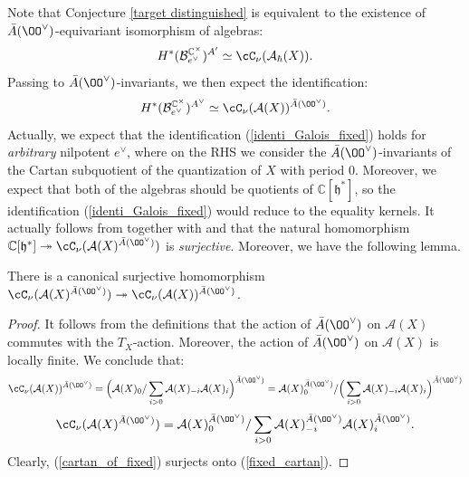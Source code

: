 \documentclass[12pt]{amsart}
\begin{document}
Note that Conjecture \ref{target distinguished} is equivalent to the existence of $\Bar{A}(\OO^\vee)$-equivariant isomorphism of algebras: 
\begin{equation}\label{identi_conj_dist_hbar_1}
    H^*(\mathcal{B}_{e^\vee}^{\mathbb{C}^\times})^{A'} \simeq \cC_\nu(\mathcal{A}_\hbar(X)).
    \end{equation}
    Passing to $\Bar{A}(\OO^\vee)$-invariants, we then expect the identification: 
    \begin{equation}\label{identi_Galois_fixed}
    H^*(\mathcal{B}_{e^\vee}^{\mathbb{C}^\times})^{A^\vee} \simeq \cC_\nu(\mathcal{A}(X))^{\Bar{A}(\OO^\vee)}.
    \end{equation}
    Actually, we expect that the identification (\ref{identi_Galois_fixed}) holds for {\emph{arbitrary}} nilpotent $e^\vee$, where on the RHS we consider the $\Bar{A}(\OO^\vee)$-invariants of the Cartan subquotient of the quantization of $X$ with period $0$. 
    Moreover, we expect that both of the algebras should be quotients of $\mathbb{C}[\mathfrak{h}^*]$, so the identification (\ref{identi_Galois_fixed}) would reduce to the equality kernels.
    It actually follows from \cite[Corollary 6.5.6]{LMBM} together with \cite[Theorem 8.5.1]{LMBM} and \cite[Theorem 5.0.1]{MBMat} that the natural homomorphism $\mathbb{C}[\mathfrak{h}^*] \twoheadrightarrow \cC_\nu(\mathcal{A}(X)^{\Bar{A}(\OO^\vee)})$ is {\emph{surjective}}. Moreover, we have the following lemma.
    \begin{lemma} \label{invariantC to Cinvariant}
        There is a canonical surjective homomorphism $\cC_\nu(\mathcal{A}(X)^{\Bar{A}(\OO^\vee)})\twoheadrightarrow \cC_\nu(\mathcal{A}(X))^{\Bar{A}(\OO^\vee)}$.
    \end{lemma}
    \begin{proof}
    It follows from the definitions that the action of $\Bar{A}(\OO^\vee)$ on $\mathcal{A}(X)$ commutes with the $T_X$-action. Moreover, the action of $\Bar{A}(\OO^\vee)$ on $\mathcal{A}(X)$  is locally finite. 
    We conclude that: 
    \begin{equation}\label{fixed_cartan}
    \cC_\nu(\mathcal{A}(X))^{\Bar{A}(\OO^\vee)} = \Big(\mathcal{A}(X)_0/\sum_{i>0}\mathcal{A}(X)_{-i}\mathcal{A}(X)_{i}\Big)^{\Bar{A}(\OO^\vee)} = \mathcal{A}(X)_0^{\Bar{A}(\OO^\vee)}/\Big(\sum_{i>0}\mathcal{A}(X)_{-i}\mathcal{A}(X)_{i}\Big)^{\Bar{A}(\OO^\vee)} 
    \end{equation}
    \begin{equation}\label{cartan_of_fixed}
    \cC_\nu(\mathcal{A}(X)^{\Bar{A}(\OO^\vee)}) = \mathcal{A}(X)^{\Bar{A}(\OO^\vee)}_0/\sum_{i>0}\mathcal{A}(X)^{\Bar{A}(\OO^\vee)}_{-i}\mathcal{A}(X)^{\Bar{A}(\OO^\vee)}_{i}.
    \end{equation}
    Clearly, (\ref{cartan_of_fixed}) surjects onto (\ref{fixed_cartan}).
    \end{proof}
    
\end{document}
